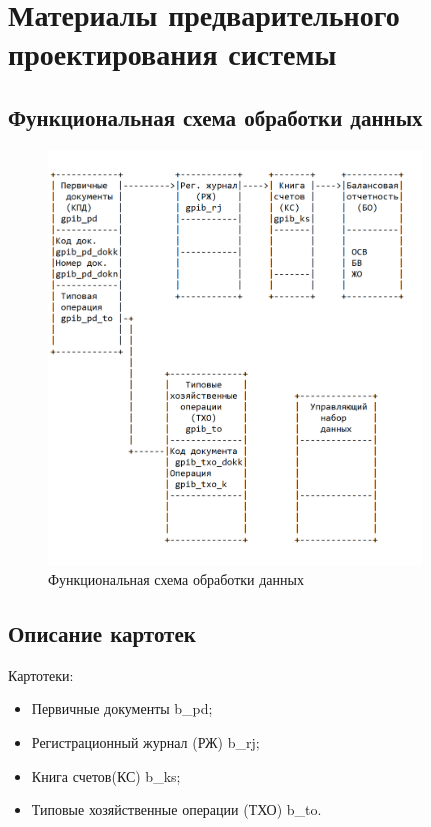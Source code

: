 \section{Материалы предварительного проектирования системы}
\subsection{Функциональная схема обработки данных}

\begin{figure}[!htb]
    \centering
    \includegraphics[height=11cm]
        {_assets/gpib_part2.png}
    \caption{Функциональная схема обработки данных}
\end{figure}

\subsection{Описание картотек}

Картотеки:

\begin{itemize}
    \item Первичные документы \gpiFIO\/b\_pd;
    \item Регистрационный журнал (РЖ) \gpiFIO\/b\_rj;
    \item Книга счетов(КС) \gpiFIO\/b\_ks;
    \item Типовые хозяйственные операции (ТХО) \gpiFIO\/b\_to.
\end{itemize}

